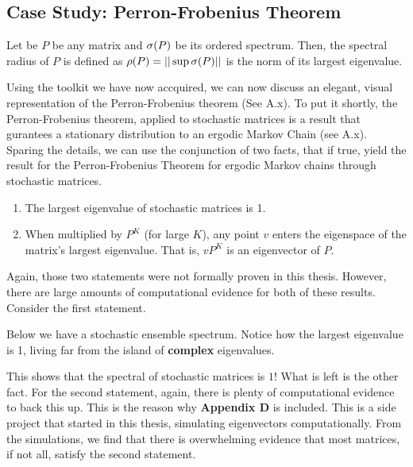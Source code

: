 \subsection{Case Study: Perron-Frobenius Theorem}

\begin{definition}
  Let be $P$ be any matrix and $\sigma(P)$ be its ordered spectrum. Then, the spectral radius of $P$ is defined as $\rho(P) = ||\sup \sigma(P)||$ is the norm of its largest eigenvalue.
\end{definition}


Using the toolkit we have now accquired, we can now discuss an elegant, visual representation of the Perron-Frobenius theorem (See A.x). To put it shortly, the Perron-Frobenius theorem, applied to stochastic matrices is a result that gurantees a stationary distribution to an ergodic Markov Chain (see A.x). Sparing the details, we can use the conjunction of two facts, that if true, yield the result for the Perron-Frobenius Theorem for ergodic Markov chains through stochastic matrices.
\begin{enumerate}
  \item The largest eigenvalue of stochastic matrices is 1.
  \item When multiplied by $P^K$ (for large $K$), any point $v$ enters the eigenspace of the matrix's largest eigenvalue. That is, $v P^K$ is an eigenvector of $P$.
\end{enumerate}

Again, those two statements were not formally proven in this thesis. However, there are large amounts of computational evidence for both of these results. Consider the first statement.

Below we have a stochastic ensemble spectrum. Notice how the largest eigenvalue is 1, living far from the island of \textbf{complex} eigenvalues.


This shows that the spectral of stochastic matrices is $1$! What is left is the other fact. For the second statement, again, there is plenty of computational evidence to back this up. This is the reason why \textbf{Appendix D} is included. This is a side project that started in this thesis, simulating eigenvectors computationally. From the simulations, we find that there is overwhelming evidence that most matrices, if not all, satisfy the second statement.

